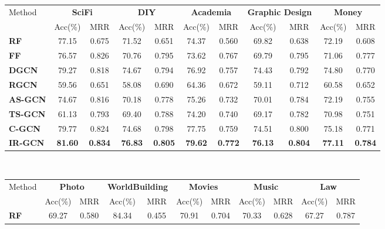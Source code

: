 \documentclass[smallcondensed]{svjour3}     %
\begin{document}
\begin{table}[h]
  \centering
  \begin{tabular}{l|c c|c c|c c|c c|c c}
     \toprule
     \multirow{2}{*}{Method} &
        \multicolumn{2}{c}{\textbf{SciFi}} &
       \multicolumn{2}{c}{\textbf{DIY}} &
       \multicolumn{2}{c}{\textbf{Academia}} &
       \multicolumn{2}{c}{\textbf{Graphic Design}} &
       \multicolumn{2}{c}{\textbf{Money}}\\
       &{Acc(\%)} & {MRR}&{Acc(\%)} & {MRR}&{Acc(\%)}& {MRR}&{Acc(\%)} & {MRR}&{Acc(\%)} & {MRR}\\
       \midrule
       \textbf{RF~\cite{BurelMA16,TianZL13}}&77.15&0.675&71.52&0.651&74.37&0.560&69.82&0.638&72.19&0.608\\

       \textbf{FF~\cite{JendersKN16}}&76.57&0.826&70.76&0.795&73.62&0.767&69.79&0.795&71.06&0.777\\

       \textbf{DGCN~\cite{DualGCN}}&79.27&0.818&74.67&0.794&76.92&0.757&74.43&0.792&74.80&0.770\\

       \textbf{RGCN~\cite{relationalGCN}}&59.56&0.651&58.08&0.690&64.36&0.672&59.11&0.712&60.58&0.652\\
      \cmidrule(lr){1-1}\cmidrule(lr){2-11}
       \textbf{AS-GCN}&74.67&0.816&70.18&0.778&75.26&0.732&70.01&0.784&72.19&0.755\\

       \textbf{TS-GCN}&61.13&0.793&69.40&0.788&74.20&0.740&69.17&0.782&70.98&0.751\\

       \textbf{C-GCN}&79.77&0.824&74.68&0.798&77.75&0.759&74.51&0.800&75.18&0.771\\

       \textbf{IR-GCN}&\textbf{81.60}&\textbf{0.834}&\textbf{76.83}&\textbf{0.805}&\textbf{79.62}&\textbf{0.772}&\textbf{76.13}&\textbf{0.804}&\textbf{77.11}&\textbf{0.784}\\
     \bottomrule
   \end{tabular}\\
   \begin{tabular}{l|c c|c c|c c|c c|c c}
      \toprule
      \multirow{2}{*}{Method} &
         \multicolumn{2}{c}{\textbf{Photo}} &
        \multicolumn{2}{c}{\textbf{WorldBuilding}} &
        \multicolumn{2}{c}{\textbf{Movies}} &
        \multicolumn{2}{c}{\textbf{Music}} &
        \multicolumn{2}{c}{\textbf{Law}}\\
        &{Acc(\%)} & {MRR}&{Acc(\%)} & {MRR}&{Acc(\%)}& {MRR}&{Acc(\%)} & {MRR}&{Acc(\%)} & {MRR}\\
        \midrule
        \textbf{RF~\cite{BurelMA16,TianZL13}}&69.27&0.580&84.34&0.455&70.91&0.704&70.33&0.628&67.27&0.787\\


\end{tabular}
\end{table}
\end{document}
